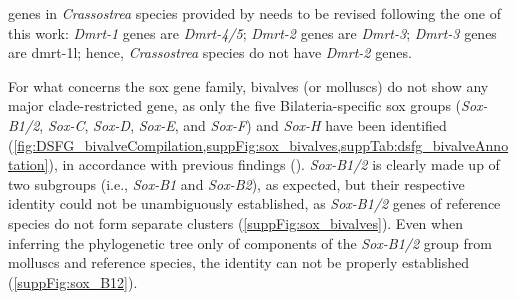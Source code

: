 genes in \textit{Crassostrea} species provided by  needs to be revised following the one of this work: \textit{Dmrt-1} genes are \textit{Dmrt-4/5}; \textit{Dmrt-2} genes are \textit{Dmrt-3}; \textit{Dmrt-3} genes are \gls{dmrt-1l}; hence, \textit{Crassostrea} species do not have \textit{Dmrt-2} genes.

For what concerns the \gls{sox} gene family, bivalves (or molluscs) do not show any major clade-restricted gene, as only the five Bilateria-specific \gls{sox} groups (\textit{Sox-B1/2}, \textit{Sox-C}, \textit{Sox-D}, \textit{Sox-E}, and \textit{Sox-F}) and \textit{Sox-H} have been identified (\cref{fig:DSFG_bivalveCompilation,suppFig:sox_bivalves,suppTab:dsfg_bivalveAnnotation}), in accordance with previous findings (). \textit{Sox-B1/2} is clearly made up of two subgroups (i.e., \textit{Sox-B1} and \textit{Sox-B2}), as expected, but their respective identity could not be unambiguously established, as \textit{Sox-B1/2} genes of reference species do not form separate clusters (\cref{suppFig:sox_bivalves}). Even when inferring the phylogenetic tree only of components of the \textit{Sox-B1/2} group from molluscs and reference species, the identity can not be properly established (\cref{suppFig:sox_B12}).

